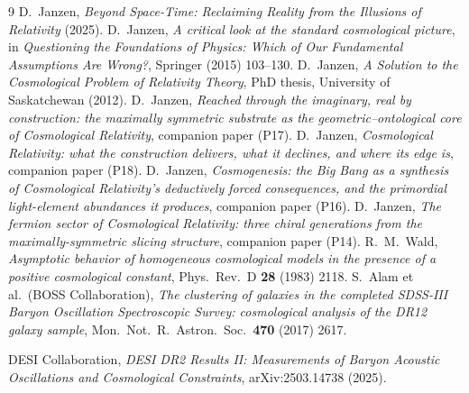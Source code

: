 \documentclass[11pt,a4paper]{article}
\theoremstyle{plain}
\theoremstyle{definition}
\theoremstyle{remark}
\begin{document}
\begin{thebibliography}{9}
 D.~Janzen, \emph{Beyond Space-Time: Reclaiming Reality from the Illusions of Relativity} (2025).
 D.~Janzen, \emph{A critical look at the standard cosmological picture}, in \emph{Questioning the Foundations of Physics: Which of Our Fundamental Assumptions Are Wrong?}, Springer (2015) 103--130.
 D.~Janzen, \emph{A Solution to the Cosmological Problem of Relativity Theory}, PhD thesis, University of Saskatchewan (2012).
 D.~Janzen, \emph{Reached through the imaginary, real by construction: the maximally symmetric substrate as the geometric--ontological core of Cosmological Relativity}, companion paper (P17).
 D.~Janzen, \emph{Cosmological Relativity: what the construction delivers, what it declines, and where its edge is}, companion paper (P18).
 D.~Janzen, \emph{Cosmogenesis: the Big Bang as a synthesis of Cosmological Relativity's deductively forced consequences, and the primordial light-element abundances it produces}, companion paper (P16).
 D.~Janzen, \emph{The fermion sector of Cosmological Relativity: three chiral generations from the maximally-symmetric slicing structure}, companion paper (P14).
 R.~M.~Wald, \emph{Asymptotic behavior of homogeneous cosmological models in the presence of a positive cosmological constant}, Phys.\ Rev.\ D \textbf{28} (1983) 2118.
 S.~Alam et al.\ (BOSS Collaboration), \emph{The clustering of galaxies in the completed SDSS-III Baryon Oscillation Spectroscopic Survey: cosmological analysis of the DR12 galaxy sample}, Mon.\ Not.\ R.\ Astron.\ Soc.\ \textbf{470} (2017) 2617.

 DESI Collaboration, \emph{DESI DR2 Results II: Measurements of Baryon Acoustic Oscillations and Cosmological Constraints}, arXiv:2503.14738 (2025).


\end{thebibliography}
\end{document}
